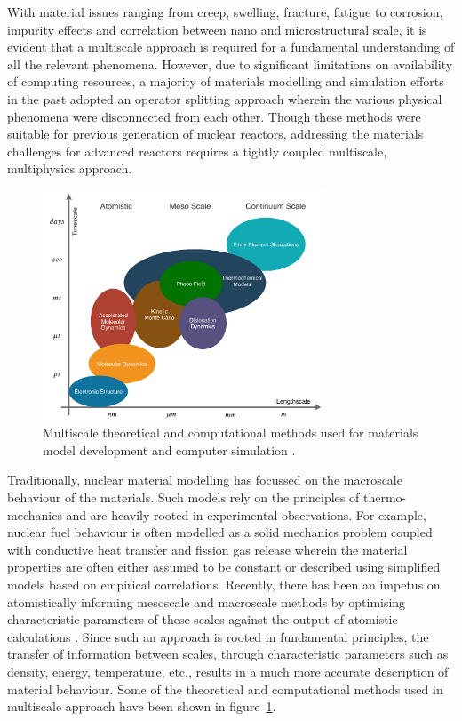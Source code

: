 	With material issues ranging from creep, swelling, fracture, fatigue to corrosion, impurity  effects and correlation between nano and microstructural scale, it is evident that a multiscale approach is required for a fundamental understanding of all the relevant phenomena. However, due to significant limitations on availability of computing resources, a majority of materials modelling and simulation efforts in the past adopted an operator splitting approach wherein the various physical phenomena were disconnected from each other. Though these methods were suitable for previous generation of nuclear reactors, addressing the materials challenges for advanced reactors requires a tightly coupled multiscale, multiphysics approach. 
	
	\begin{figure}[htbp]
		\centering
		\includegraphics[width=0.75\textwidth]{figures/Multiphysics.pdf}
		\caption{Multiscale theoretical and computational methods used for materials model development and computer simulation \cite{STAN200920}.}
		\label{fig:multiphys}
	\end{figure}
	
	Traditionally, nuclear material modelling has focussed on the macroscale behaviour of the materials. Such models rely on the principles of thermo-mechanics and are heavily rooted in experimental observations. For example, nuclear fuel behaviour is often modelled as a solid mechanics problem coupled with conductive heat transfer and fission gas release wherein the material properties are often either assumed to be constant or described using simplified models based on empirical correlations. Recently, there has been an impetus on atomistically informing mesoscale  and macroscale methods by optimising characteristic parameters of these scales against the output of atomistic calculations \cite{STAN200920}. Since such an approach is rooted in fundamental principles, the transfer of information between scales, through characteristic parameters such as density, energy, temperature, etc., results in a much more accurate description of material behaviour. Some of the theoretical and computational methods used in multiscale approach have been shown in figure~\ref{fig:multiphys}.

